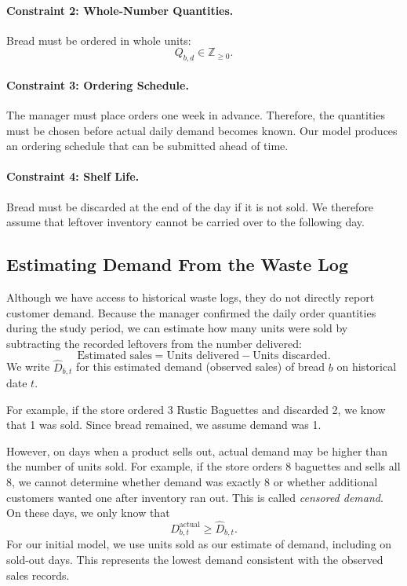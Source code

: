 \documentclass[11pt]{article}
\begin{document}
\paragraph{Constraint 2: Whole-Number Quantities.}
Bread must be ordered in whole units:
\begin{equation}
\boxed{Q_{b,d}\in\mathbb{Z}_{\ge 0}.}
\label{eq:integer}
\end{equation}

\paragraph{Constraint 3: Ordering Schedule.}
The manager must place orders one week in advance. Therefore, the quantities must be chosen before actual daily demand becomes known. Our model produces an ordering schedule that can be submitted ahead of time.

\paragraph{Constraint 4: Shelf Life.}
Bread must be discarded at the end of the day if it is not sold. We therefore assume that leftover inventory cannot be carried over to the following day.

\subsection{Estimating Demand From the Waste Log}

Although we have access to historical waste logs, they do not directly report customer demand. Because the manager confirmed the daily order quantities during the study period, we can estimate how many units were sold by subtracting the recorded leftovers from the number delivered:
\begin{equation}
\text{Estimated sales}=\text{Units delivered}-\text{Units discarded}.
\label{eq:estimated-demand}
\end{equation}
We write $\widehat D_{b,t}$ for this estimated demand (observed sales) of bread $b$ on historical date $t$.

For example, if the store ordered 3 Rustic Baguettes and discarded 2, we know that 1 was sold. Since bread remained, we assume demand was 1.

However, on days when a product sells out, actual demand may be higher than the number of units sold. For example, if the store orders 8 baguettes and sells all 8, we cannot determine whether demand was exactly 8 or whether additional customers wanted one after inventory ran out. This is called \emph{censored demand}. On these days, we only know that
\begin{equation}
D_{b,t}^{\mathrm{actual}}\ge \widehat D_{b,t}.
\end{equation}
For our initial model, we use units sold as our estimate of demand, including on sold-out days. This represents the lowest demand consistent with the observed sales records.
\end{document}
